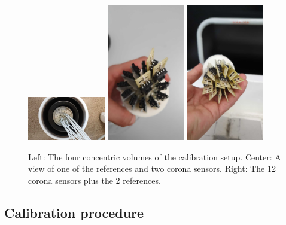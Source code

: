 \begin{figure}[htbp]
\centering
{\includegraphics[width=0.303\textwidth,
trim=0cm 4cm 0cm 4.7cm, clip]{images/figure_16_a.jpg}}
{\includegraphics[width=0.3\textwidth, trim=0cm 4cm 0cm 7cm, clip]{images/figure_16_b.jpg}}
{\includegraphics[width=0.3\textwidth, trim=0cm 4cm 0cm 7cm, clip]{images/figure_16_c.jpg}}
\caption{Left: The four concentric volumes of the calibration setup. Center: A view of one of the references and two corona sensors. Right: The 12 corona sensors plus the 2 references.}
\label{fig:newSetup}
\end{figure}

\subsection{Calibration procedure}
\label{sec:new_calib_procedure}

